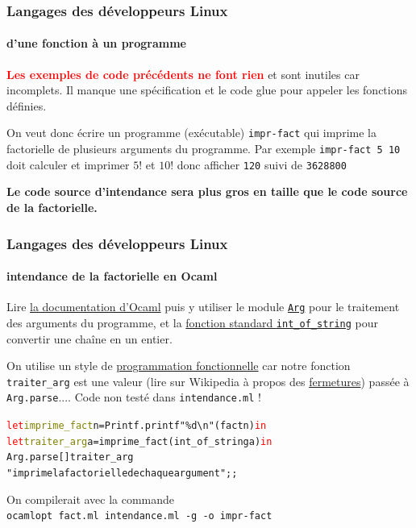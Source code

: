 \documentclass[xcolor=svgnames,final,smaller,a4]{beamer}
\begin{document}
\begin{frame}
  \frametitle{Langages des développeurs Linux}
  \framesubtitle{d'une fonction à un programme}

\textcolor{red}{\textbf{Les exemples de code précédents ne font rien}}
et sont inutiles car incomplets. Il manque une spécification et le
code glue pour appeler les fonctions définies.

\vspace{0.5cm} On veut donc écrire un programme (exécutable)
\texttt{impr-fact} qui imprime la factorielle de plusieurs arguments
du programme. Par exemple \texttt{impr-fact 5 10} doit calculer et
imprimer $5!$ et $10!$ donc afficher \texttt{120} suivi de
\texttt{3628800}

\vspace{1cm}

\textbf{Le code source d'intendance sera plus gros en
taille que le code source de la factorielle.}

\end{frame}

\begin{frame}
  \frametitle{Langages des développeurs Linux}
  \framesubtitle{intendance de la factorielle en Ocaml}

  Lire \href{https://ocaml.org/releases/4.10/htmlman/index.html}{la
    documentation d'Ocaml} puis y utiliser le module
  \href{https://ocaml.org/releases/4.10/htmlman/libref/Arg.html}{\texttt{Arg}}
  pour le traitement des arguments du programme,  et la
  \href{http://caml.inria.fr/pub/docs/manual-ocaml/libref/Stdlib.html\#VALint\_of\_string}{fonction
    standard \texttt{int\_of\_string}} pour convertir une chaîne en un
  entier.

  On utilise un style de
  \href{https://fr.wikipedia.org/wiki/Programmation_fonctionnelle}{programmation
    fonctionnelle} car notre fonction \texttt{traiter\_arg} est une
  valeur (lire sur Wikipedia à propos des
  \href{https://fr.wikipedia.org/wiki/Fermeture\_(informatique)}{fermetures})
  passée à \texttt{Arg.parse}.... Code non testé dans
  \texttt{intendance.ml} !

  \begin{alltt}
    \textcolor{red}{let} \textcolor{Olive}{imprime\_fact} n = Printf.printf "\%d\textbackslash{n}" (fact n) \textcolor{red}{in}\\
    \textcolor{red}{let} \textcolor{Olive}{traiter\_arg} a = imprime\_fact (int\_of\_string a)  \textcolor{red}{in}\\
    Arg.parse [] traiter\_arg \\
    \hspace{0.5cm}    "imprime la factorielle de chaque argument";;
  \end{alltt}
  
  On compilerait avec la commande\\
  \texttt{ocamlopt fact.ml intendance.ml -g -o impr-fact}
\end{frame}
\end{document}
